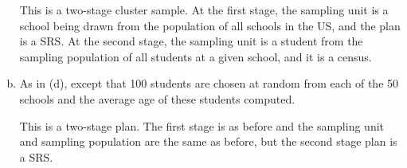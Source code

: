 \documentclass{homework}
\begin{document}
\begin{enumerate}[(a)]
\begin{solution}
    This is a two-stage cluster sample.  At the first stage, the sampling unit is a school being drawn from the population of all schools in the US, and the plan is a SRS.  At the second stage, the sampling unit is a student from the sampling population of all students at a given school, and it is a census.
    \end{solution}
    \item As in (d), except that 100 students are chosen at random from each of the 50 schools and the average age of these students computed.
    \begin{solution}
      This is a two-stage plan. The first stage is as before and the sampling unit and sampling population are the same as before, but the second stage plan is a SRS.
    \end{solution}
  \end{enumerate}
\end{document}

